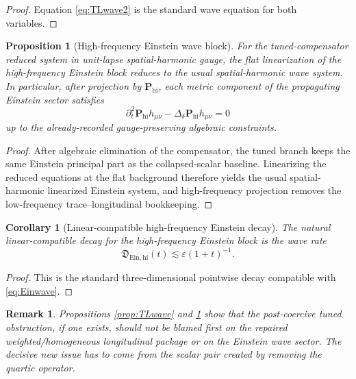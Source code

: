 \documentclass[11pt]{article}
\newtheorem{proposition}{Proposition}
\newtheorem{remark}{Remark}
\newtheorem{corollary}{Corollary}
\begin{document}
\begin{proof}
Equation \eqref{eq:TLwave2} is the standard wave equation for both variables.
\end{proof}

\begin{proposition}[High-frequency Einstein wave block]
\label{prop:Einwave}
For the tuned-compensator reduced system in unit-lapse spatial-harmonic gauge, the flat linearization of the high-frequency Einstein block reduces to the usual spatial-harmonic wave system. In particular, after projection by \(\mathbf P_{\mathrm{hi}}\), each metric component of the propagating Einstein sector satisfies
\begin{equation}
\partial_t^2 \mathbf P_{\mathrm{hi}}h_{\mu\nu}
-\Delta_\delta \mathbf P_{\mathrm{hi}}h_{\mu\nu}
=0
\label{eq:Einwave}
\end{equation}
up to the already-recorded gauge-preserving algebraic constraints.
\end{proposition}

\begin{proof}
After algebraic elimination of the compensator, the tuned branch keeps the same Einstein principal part as the collapsed-scalar baseline. Linearizing the reduced equations at the flat background therefore yields the usual spatial-harmonic linearized Einstein system, and high-frequency projection removes the low-frequency trace--longitudinal bookkeeping.
\end{proof}

\begin{corollary}[Linear-compatible high-frequency Einstein decay]
\label{cor:Eindecay}
The natural linear-compatible decay for the high-frequency Einstein block is the wave rate
\begin{equation}
\mathfrak D_{\mathrm{Ein,hi}}(t)\lesssim \varepsilon(1+t)^{-1}.
\label{eq:Einrate}
\end{equation}
\end{corollary}

\begin{proof}
This is the standard three-dimensional pointwise decay compatible with \eqref{eq:Einwave}.
\end{proof}

\begin{remark}
Propositions \ref{prop:TLwave} and \ref{prop:Einwave} show that the post-coercive tuned obstruction, if one exists, should not be blamed first on the repaired weighted/homogeneous longitudinal package or on the Einstein wave sector. The decisive new issue has to come from the scalar pair created by removing the quartic operator.
\end{remark}
\end{document}
